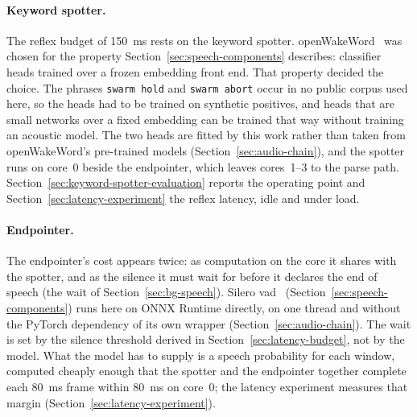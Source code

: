\paragraph{Keyword spotter.} The reflex budget of 150~ms rests on the keyword spotter.
openWakeWord~\cite{oww} was chosen for the property Section~\ref{sec:speech-components} describes:
classifier heads trained over a frozen embedding front end.
That property decided the choice. The phrases \texttt{swarm hold} and \texttt{swarm abort} occur in
no public corpus used here, so the heads had to be trained on synthetic positives, and heads that
are small networks over a fixed embedding can be trained that way without training an acoustic
model. The two heads are fitted by this work rather than taken from openWakeWord's pre-trained
models (Section~\ref{sec:audio-chain}), and the spotter runs on core~0 beside the endpointer, which
leaves cores~1--3 to the parse path. Section~\ref{sec:keyword-spotter-evaluation} reports the
operating point and Section~\ref{sec:latency-experiment} the reflex latency, idle and under load.

\paragraph{Endpointer.} The endpointer's cost appears twice: as computation on the core it shares
with the spotter, and as the silence it must wait for before it declares the end of speech (the
wait of Section~\ref{sec:bg-speech}). Silero \gls{vad}~\cite{silero}
(Section~\ref{sec:speech-components}) runs here on ONNX Runtime directly, on one thread and without
the PyTorch dependency of its own wrapper (Section~\ref{sec:audio-chain}). The wait is set by the
silence threshold derived in Section~\ref{sec:latency-budget}, not by the model. What the model has
to supply is a speech probability for each window, computed cheaply enough that the spotter and the
endpointer together complete each 80~ms frame within 80~ms on core~0; the latency experiment
measures that margin (Section~\ref{sec:latency-experiment}).

